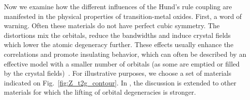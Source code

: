 \documentclass[aps,prl,amsmath, amssymb, english, aps, prl, onecolumn,
  reprint,floatfix, superscriptaddress]{revtex4-1}
\begin{document}

Now we examine how the different influences of the Hund's rule
coupling are manifested in the physical properties of transition-metal
oxides.  First, a word of warning. Often these materials do not have
perfect cubic symmetry.  The distortions mix the orbitals, reduce the
bandwidths and induce crystal fields which lower the atomic degeneracy
further.  These effects usually enhance the correlations and promote
insulating behavior, which can often be described by an effective
model with a smaller number of orbitals (as some are emptied or filled
by the crystal
fields)~\cite{manini_orbital_2002_prb,pavarini04,poteryaev_crystalfield_prb_2008}.
For illustrative purposes, we choose a set of materials indicated on
Fig.~\ref{fig:Z_t2g_contour}.  In \cite{Janus_Supp}, the
discussion is extended to other materials for which the lifting of
orbital degeneracies is stronger.
\end{document}
